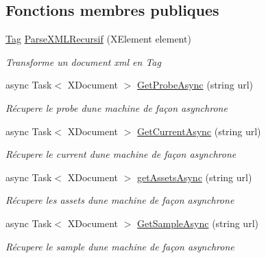 \subsection*{Fonctions membres publiques}
\begin{DoxyCompactItemize}
\item 
\mbox{\hyperlink{class_m_t_connect_agent_1_1_model_1_1_tag}{Tag}} \mbox{\hyperlink{class_m_t_connect_agent_1_1_b_l_l_1_1_m_t_connect_client_a1500af478377913d4a5ad6e56e532af8}{Parse\+X\+M\+L\+Recursif}} (X\+Element element)
\begin{DoxyCompactList}\small\item\em Transforme un document xml en Tag \end{DoxyCompactList}\item 
async Task$<$ X\+Document $>$ \mbox{\hyperlink{class_m_t_connect_agent_1_1_b_l_l_1_1_m_t_connect_client_a6a7f9024ead2a10401a80be8ac504e7b}{Get\+Probe\+Async}} (string url)
\begin{DoxyCompactList}\small\item\em Récupere le probe d\textquotesingle{}une machine de façon asynchrone \end{DoxyCompactList}\item 
async Task$<$ X\+Document $>$ \mbox{\hyperlink{class_m_t_connect_agent_1_1_b_l_l_1_1_m_t_connect_client_a98f0238b0ad50cb531ff790c39e4b00d}{Get\+Current\+Async}} (string url)
\begin{DoxyCompactList}\small\item\em Récupere le current d\textquotesingle{}une machine de façon asynchrone \end{DoxyCompactList}\item 
async Task$<$ X\+Document $>$ \mbox{\hyperlink{class_m_t_connect_agent_1_1_b_l_l_1_1_m_t_connect_client_a70ce6301ae2f75b317c73b4a35660e41}{get\+Assets\+Async}} (string url)
\begin{DoxyCompactList}\small\item\em Récupere les assets d\textquotesingle{}une machine de façon asynchrone \end{DoxyCompactList}\item 
async Task$<$ X\+Document $>$ \mbox{\hyperlink{class_m_t_connect_agent_1_1_b_l_l_1_1_m_t_connect_client_a391ac09f130d6e39d6d57f2e35c62b72}{Get\+Sample\+Async}} (string url)
\begin{DoxyCompactList}\small\item\em Récupere le sample d\textquotesingle{}une machine de façon asynchrone \end{DoxyCompactList}\item 

\end{DoxyCompactItemize}
